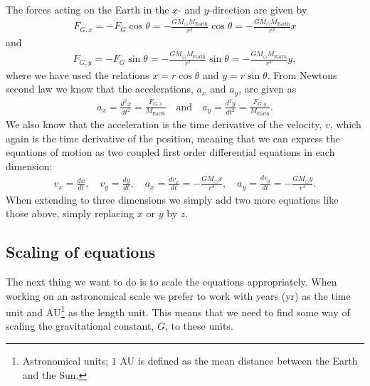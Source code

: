 \documentclass[12pt, a4paper]{article}
\begin{document}
The forces acting on the Earth in the $x$- and $y$-direction are given by 
\begin{align*}
F_{G,x} = - F_G \cos\theta  = - \frac{GM_{\odot} M_{\text{Earth}}}{r^2}\cos\theta 
							= - \frac{GM_{\odot} M_{\text{Earth}}}{r^3}x 
\end{align*} 
and 
\begin{align*}
F_{G,y} = - F_G \sin\theta  = - \frac{GM_{\odot} M_{\text{Earth}}}{r^2}\sin\theta 
							= - \frac{GM_{\odot} M_{\text{Earth}}}{r^3}y,  
\end{align*}
where we have used the relations $x = r\cos\theta$ and $y = r\sin\theta$. From Newtons second law we know 
that the accelerations, $a_x$ and $a_y$, are given as 
\begin{align*}
a_x = \frac{d^2x}{dt^2} = \frac{F_{G,x}}{M_{\text{Earth}}} \quad \text{and} \quad 
a_y = \frac{d^2y}{dt^2} = \frac{F_{G,y}}{M_{\text{Earth}}}. 
\end{align*} 
We also know that the acceleration is the time derivative of the velocity, $v$, which again is 
the time derivative of the position, meaning that we can express the equations of motion as two 
coupled first order differential equations in each dimension:  
\begin{align}
v_x = \frac{dx}{dt}, \quad v_y = \frac{dy}{dt}, \quad 
a_x = \frac{dv_x}{dt} = -\frac{GM_{\odot}x}{r^3}, \quad a_y = \frac{dv_y}{dt} = -\frac{GM_{\odot}y}{r^3}.   
\label{eq:diff_eqs}
\end{align}
When extending to three dimensions we simply add two more equations like those above, simply 
replacing $x$ or $y$ by $z$. 

\subsection{Scaling of equations}

The next thing we want to do is to scale the equations appropriately. When working on an astronomical 
scale we prefer to work with years (yr) as the time unit and AU\footnote{Astronomical units; $1$ AU is
defined as the mean distance between the Earth and the Sun.} as the length unit. This means that we 
need to find some way of scaling the gravitational constant, $G$, to these units. 
\end{document}
